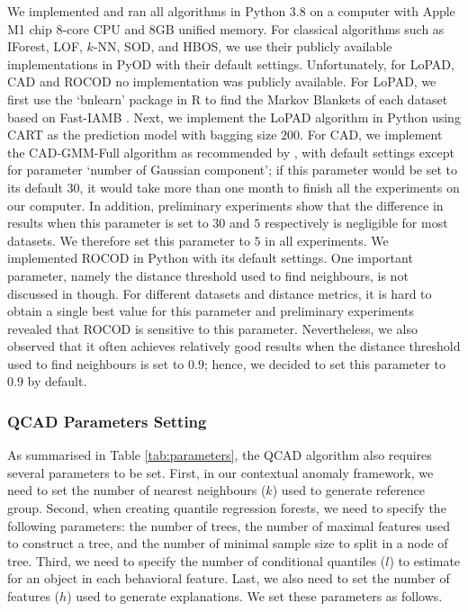 \documentclass[pdflatex,sn-basic]{sn-jnl}%
\theoremstyle{thmstyleone}%
\theoremstyle{thmstyletwo}%
\theoremstyle{thmstylethree}%
\begin{document}
We implemented and ran all algorithms in Python $3.8$ on a computer with Apple M1 chip 8-core CPU and 8GB unified memory. For classical algorithms such as IForest, LOF, $k$-NN, SOD, and HBOS, we use their publicly available implementations in PyOD \citep{zhao2019pyod} with their default settings. Unfortunately, for LoPAD, CAD and ROCOD no implementation was publicly available. For LoPAD, we first use the `bnlearn' package \citep{scutari2019package} in R to find the Markov Blankets of each dataset based on Fast-IAMB \citep{yaramakala2005speculative}. Next, we implement the LoPAD algorithm in Python using CART \citep{breiman2017classification} as the prediction model with bagging size $200$. For CAD, we implement the CAD-GMM-Full algorithm as recommended by \cite{song2007conditional}, with default settings except for parameter `number of Gaussian component'; if this parameter would be set to its default 30, it would take more than one month to finish all the experiments on our computer. In addition, preliminary experiments show that the difference in results when this parameter is set to $30$ and $5$ respectively is negligible for most datasets. We therefore set this parameter to $5$ in all experiments. We implemented ROCOD in Python with its default settings. One important parameter, namely the distance threshold used to find neighbours, is not discussed in \cite{liang2016robust} though. For different datasets and distance metrics, it is hard to obtain a single best value for this parameter and preliminary experiments revealed that ROCOD is sensitive to this parameter. Nevertheless, we also observed that it often achieves relatively good results when the distance threshold used to find neighbours is set to $0.9$; hence, we decided to set this parameter to $0.9$ by default.

\subsubsection{QCAD Parameters Setting}
\label{subsec:ParametersSettings}


As summarised in Table \ref{tab:parameters}, the QCAD algorithm also requires several parameters to be set. First, in our contextual anomaly framework, we need to set the number of nearest neighbours ($k$) used to generate reference group. Second, when creating quantile regression forests, we need to specify the following parameters: the number of trees, the number of maximal features used to construct a tree, and the number of minimal sample size to split in a node of tree. Third, we need to specify the number of conditional quantiles ($l$) to estimate for an object in each behavioral feature. Last, we also need to set the number of features ($h$) used to generate explanations. We set these parameters as follows.
\end{document}
